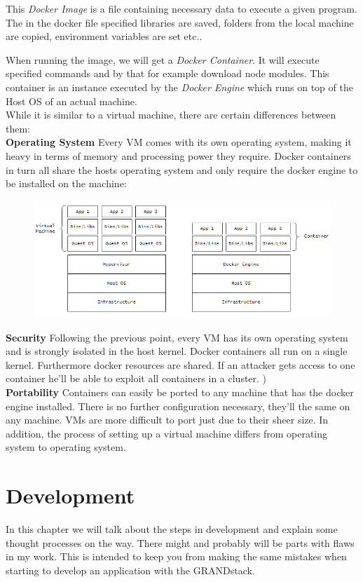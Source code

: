 This \emph{Docker Image} is a file containing necessary data to execute a given program. The in the docker file specified libraries are saved, folders from the local machine are copied, environment variables are set etc.. 

When running the image, we will get a \emph{Docker Container}. It will execute specified commands and by that for example download node modules. This container is an instance executed by the \emph{Docker Engine} which runs on top of the Host OS of an actual machine.
\\

While it is similar to a virtual machine, there are certain differences between them: \\
\textbf{Operating System} Every VM comes with its own operating system, making it heavy in terms of memory and processing power they require. Docker containers in turn all share the hosts operating system and only require the docker engine to be installed on the machine: \cite{GeekDocker}
\begin{figure}[H]
\centering
\includegraphics[scale=.8]{Bilder/DockerVsVM.png}
\label{ex312}
\end{figure}
\noindent
\textbf{Security} Following the previous point, every VM has its own operating system and is strongly isolated in the host kernel. Docker containers all run on a single kernel. Furthermore docker resources are shared. If an attacker gets access to one container he'll be able to exploit  all containers in a cluster. \cite{GeekDocker}) \\
\textbf{Portability} Containers can easily be ported to any machine that has the docker engine installed. There is no further configuration necessary, they'll the same on any machine. VMs are more difficult to port just due to their sheer size. In addition, the process of setting up a virtual machine differs from operating system to operating system. 

\chapter{Development}
In this chapter we will talk about the steps in development and explain some thought processes on the way. There might and probably will be parts with flaws in my work. This is intended to keep you from making the same mistakes when starting to develop an application with the GRANDstack. 

